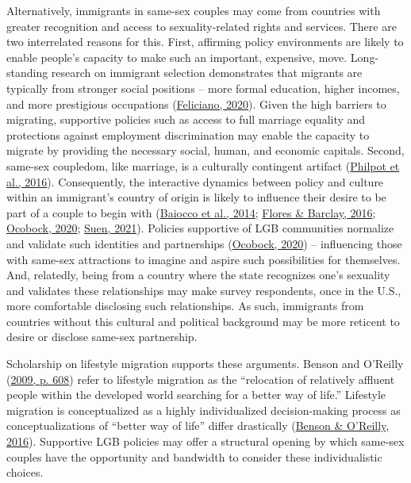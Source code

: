 \documentclass[
  11pt,
]{article}
\begin{document}
Alternatively, immigrants in same-sex couples may come from countries with greater recognition and access to sexuality-related rights and services. There are two interrelated reasons for this. First, affirming policy environments are likely to enable people's capacity to make such an important, expensive, move. Long-standing research on immigrant selection demonstrates that migrants are typically from stronger social positions -- more formal education, higher incomes, and more prestigious occupations (\protect\hyperlink{ref-feliciano_2020}{Feliciano, 2020}). Given the high barriers to migrating, supportive policies such as access to full marriage equality and protections against employment discrimination may enable the capacity to migrate by providing the necessary social, human, and economic capitals. Second, same-sex coupledom, like marriage, is a culturally contingent artifact (\protect\hyperlink{ref-philpot_2016_gay}{Philpot et al., 2016}). Consequently, the interactive dynamics between policy and culture within an immigrant's country of origin is likely to influence their desire to be part of a couple to begin with (\protect\hyperlink{ref-baiocco_2014_desire}{Baiocco et al., 2014}; \protect\hyperlink{ref-flores_2016_backlash}{Flores \& Barclay, 2016}; \protect\hyperlink{ref-ocobock_2020_leveraging}{Ocobock, 2020}; \protect\hyperlink{ref-suen_2021_sexual}{Suen, 2021}). Policies supportive of LGB communities normalize and validate such identities and partnerships (\protect\hyperlink{ref-ocobock_2020_leveraging}{Ocobock, 2020}) -- influencing those with same-sex attractions to imagine and aspire such possibilities for themselves. And, relatedly, being from a country where the state recognizes one's sexuality and validates these relationships may make survey respondents, once in the U.S., more comfortable disclosing such relationships. As such, immigrants from countries without this cultural and political background may be more reticent to desire or disclose same-sex partnership.

Scholarship on lifestyle migration supports these arguments. Benson and O'Reilly (\protect\hyperlink{ref-benson_2009}{2009, p. 608}) refer to lifestyle migration as the ``relocation of relatively affluent people within the developed world searching for a better way of life.'' Lifestyle migration is conceptualized as a highly individualized decision-making process as conceptualizations of ``better way of life'' differ drastically (\protect\hyperlink{ref-benson_2016}{Benson \& O'Reilly, 2016}). Supportive LGB policies may offer a structural opening by which same-sex couples have the opportunity and bandwidth to consider these individualistic choices.
\end{document}
